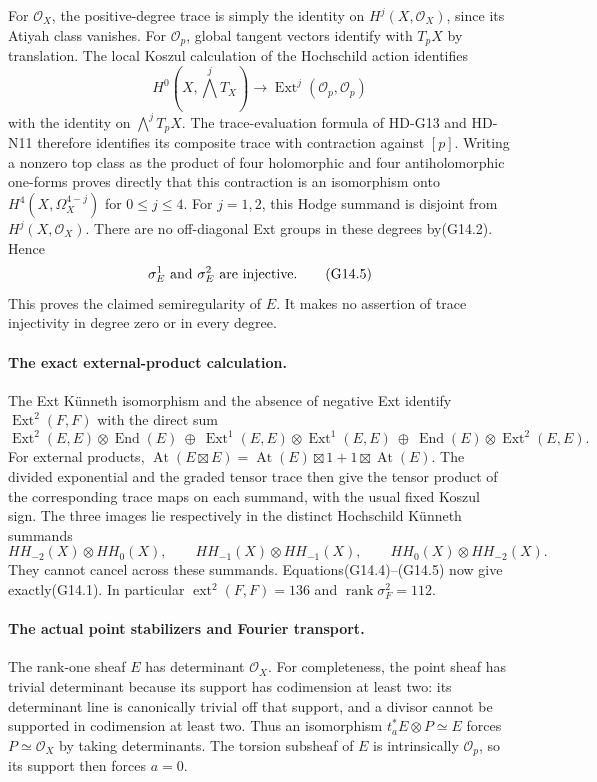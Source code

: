 For $\mathcal O_X$, the positive-degree trace is simply the
identity on $H^j(X,\mathcal O_X)$, since its Atiyah class
vanishes. For $\mathcal O_p$, global tangent vectors identify
with $T_pX$ by translation. The local Koszul calculation of
the Hochschild action identifies
\[
 H^0(X,\bigwedge^jT_X)\longrightarrow
             \operatorname{Ext}^j(\mathcal O_p,\mathcal O_p)
\]
with the identity on $\bigwedge^jT_pX$.
The trace-evaluation formula of HD-G13 and HD-N11 therefore
identifies its composite trace with contraction against $[p]$.
Writing a nonzero top class as the product of four holomorphic
and four antiholomorphic one-forms proves directly that this
contraction is an isomorphism onto
$H^4(X,\Omega_X^{4-j})$ for $0\le j\le4$.
For $j=1,2$, this Hodge summand is disjoint from
$H^j(X,\mathcal O_X)$. There are no off-diagonal Ext groups
in these degrees by(G14.2). Hence
\[
       \sigma_E^1\ \hbox{and}\ \sigma_E^2
                     \ \hbox{are injective}.              \tag{G14.5}
\]
This proves the claimed semiregularity of $E$. It makes no
assertion of trace injectivity in degree zero or in every
degree.

\paragraph{The exact external-product calculation.}
The Ext K\"unneth isomorphism and the absence of negative Ext
identify $\operatorname{Ext}^2(F,F)$ with the direct sum
\[
 \operatorname{Ext}^2(E,E)\otimes\operatorname{End}(E)
 \ \oplus\
 \operatorname{Ext}^1(E,E)\otimes\operatorname{Ext}^1(E,E)
 \ \oplus\
 \operatorname{End}(E)\otimes\operatorname{Ext}^2(E,E).
                                                               \tag{G14.6}
\]
For external products,
$\operatorname{At}(E\boxtimes E)
 =\operatorname{At}(E)\boxtimes1+1\boxtimes\operatorname{At}(E)$.
The divided exponential and the graded tensor trace then
give the tensor product of the corresponding trace maps
on each summand, with the usual fixed Koszul sign.
The three images lie respectively in the distinct Hochschild
K\"unneth summands
\[
 HH_{-2}(X)\otimes HH_0(X),\qquad
 HH_{-1}(X)\otimes HH_{-1}(X),\qquad
 HH_0(X)\otimes HH_{-2}(X).                                \tag{G14.7}
\]
They cannot cancel across these summands.
Equations(G14.4)--(G14.5) now give exactly(G14.1).
In particular $\operatorname{ext}^2(F,F)=136$ and
$\operatorname{rank}\sigma_F^2=112$.

\paragraph{The actual point stabilizers and Fourier transport.}
The rank-one sheaf $E$ has determinant $\mathcal O_X$.
For completeness, the point sheaf has trivial determinant
because its support has codimension at least two: its
determinant line is canonically trivial off that support,
and a divisor cannot be supported in codimension at least two.
Thus an isomorphism $t_a^*E\otimes P\simeq E$ forces
$P\simeq\mathcal O_X$ by taking determinants.
The torsion subsheaf of $E$ is intrinsically $\mathcal O_p$,
so its support then forces $a=0$.

